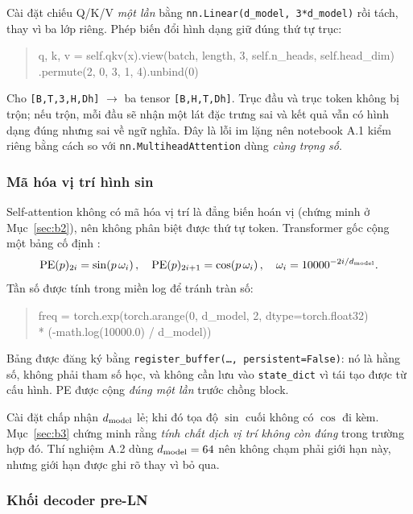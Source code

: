 Cài đặt chiếu Q/K/V \emph{một lần} bằng \texttt{nn.Linear(d\_model, 3*d\_model)} rồi
tách, thay vì ba lớp riêng. Phép biến đổi hình dạng giữ đúng thứ tự trục:

\begin{quote}\small\ttfamily
q, k, v = self.qkv(x).view(batch, length, 3, self.n\_heads, self.head\_dim)\\
\hspace*{6em}.permute(2, 0, 3, 1, 4).unbind(0)
\end{quote}

Cho \texttt{[B,T,3,H,Dh]} $\to$ ba tensor \texttt{[B,H,T,Dh]}. Trục đầu và trục
token không bị trộn; nếu trộn, mỗi đầu sẽ nhận một lát đặc trưng sai và kết quả vẫn
có hình dạng đúng nhưng sai về ngữ nghĩa. Đây là lỗi im lặng nên notebook A.1 kiểm
riêng bằng cách so với \texttt{nn.MultiheadAttention} dùng \emph{cùng trọng số}.

\subsubsection{Mã hóa vị trí hình sin}

Self-attention không có mã hóa vị trí là đẳng biến hoán vị (chứng minh ở
Mục~\ref{sec:b2}), nên không phân biệt được thứ tự token. Transformer gốc cộng một
bảng cố định \cite[§3.5]{attention}:
\[
  \mathrm{PE}(p)_{2i}=\sin\!\left(p\,\omega_i\right),\quad
  \mathrm{PE}(p)_{2i+1}=\cos\!\left(p\,\omega_i\right),\quad
  \omega_i=10000^{-2i/d_{\mathrm{model}}}.
\]
Tần số được tính trong miền log để tránh tràn số:

\begin{quote}\small\ttfamily
freq = torch.exp(torch.arange(0, d\_model, 2, dtype=torch.float32)\\
\hspace*{6em}* (-math.log(10000.0) / d\_model))
\end{quote}

Bảng được đăng ký bằng \texttt{register\_buffer(\ldots, persistent=False)}: nó là
hằng số, không phải tham số học, và không cần lưu vào \texttt{state\_dict} vì tái
tạo được từ cấu hình. PE được cộng \emph{đúng một lần} trước chồng block.

Cài đặt chấp nhận $d_{\mathrm{model}}$ lẻ; khi đó tọa độ $\sin$ cuối không có $\cos$ đi kèm.
Mục~\ref{sec:b3} chứng minh rằng \emph{tính chất dịch vị trí không còn đúng} trong
trường hợp đó. Thí nghiệm A.2 dùng $d_{\mathrm{model}}=64$ nên không chạm phải giới hạn này,
nhưng giới hạn được ghi rõ thay vì bỏ qua.

\subsubsection{Khối decoder pre-LN}

